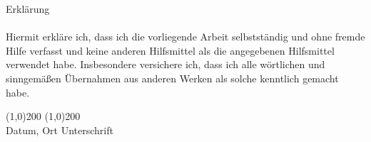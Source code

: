 Erklärung\\
\\
Hiermit erkläre ich, dass ich die vorliegende Arbeit selbstständig und ohne fremde Hilfe verfasst und keine anderen Hilfsmittel als die angegebenen Hilfsmittel verwendet habe. 
Insbesondere versichere ich, dass ich alle wörtlichen und sinngemäßen Übernahmen aus anderen Werken als solche kenntlich gemacht habe. 

\vspace{50pt}
\noindent\line(1,0){200} \hfill \line(1,0){200}\\
\noindent Datum, Ort \hfill Unterschrift